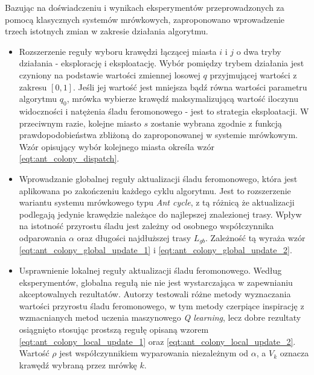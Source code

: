 {{{            Bazując na doświadczeniu i wynikach eksperymentów przeprowadzonych za pomocą klasycznych systemów
            mrówkowych, zaproponowano wprowadzenie trzech istotnych zmian w zakresie działania algorytmu.

            \begin{itemize}
                \item Rozszerzenie reguły wyboru krawędzi łączącej miasta $i$ i $j$ o dwa tryby działania - eksplorację
                i eksploatację. Wybór pomiędzy trybem działania jest czyniony na podstawie wartości zmiennej losowej $q$
                przyjmującej wartości z zakresu $[0, 1]$. Jeśli jej wartość jest mniejsza bądź równa wartości parametru
                algorytmu $q_0$, mrówka wybierze krawędź maksymalizującą wartość iloczynu widoczności i natężenia śladu
                feromonowego - jest to strategia eksploatacji. W przeciwnym razie, kolejne miasto $s$ zostanie wybrana
                zgodnie z funkcją prawdopodobieństwa zbliżoną do zaproponowanej w systemie mrówkowym. Wzór opisujący
                wybór kolejnego miasta określa wzór \ref{eqt:ant_colony_dispatch}.

                \item Wprowadzanie globalnej reguły aktualizacji śladu feromonowego, która jest aplikowana po
                zakończeniu każdego cyklu algorytmu. Jest to rozszerzenie wariantu systemu mrówkowego typu \textit{Ant
                cycle}, z tą różnicą że aktualizacji podlegają jedynie krawędzie należące do najlepszej znalezionej
                trasy. Wpływ na istotność przyrostu śladu jest zależny od osobnego współczynnika odparowania $\alpha$
                oraz długości najdłuższej trasy $L_{gb}$. Zależność tą wyraża wzór \ref{eqt:ant_colony_global_update_1}
                i \ref{eqt:ant_colony_global_update_2}.

                \item Usprawnienie lokalnej reguły aktualizacji śladu feromonowego. Według eksperymentów, globalna
                regułą nie nie jest wystarczająca w zapewnianiu akceptowalnych rezultatów. Autorzy testowali różne
                metody wyznaczania wartości przyrostu śladu feromonowego, w tym metody czerpiące inspirację z
                wzmacnianych metod uczenia maszynowego \textit{Q learning}\cite{Watkins1989LearningFD}, lecz dobre
                rezultaty osiągnięto stosując prostszą regułę opisaną wzorem \ref{eqt:ant_colony_local_update_1} oraz
                \ref{eqt:ant_colony_local_update_2}. Wartość $\rho$ jest współczynnikiem wyparowania niezależnym od
                $\alpha$, a $V_k$ oznacza krawędź wybraną przez mrówkę $k$.
            \end{itemize}

}}}
